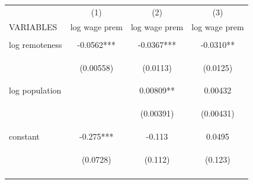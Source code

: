 \documentclass[12 pt]{article}
\begin{document}
\begin{table}
    \centering
    \begin{tabular}{lccc} \hline
     & (1) & (2) & (3) \\
    VARIABLES & log wage prem & log wage prem & log wage prem \\ \hline
    \vspace{4pt} & \begin{footnotesize}\end{footnotesize} & \begin{footnotesize}\end{footnotesize} & \begin{footnotesize}\end{footnotesize} \\
    log remoteness & -0.0562*** & -0.0367*** & -0.0310** \\
    \vspace{4pt} & \begin{footnotesize}(0.00558)\end{footnotesize} & \begin{footnotesize}(0.0113)\end{footnotesize} & \begin{footnotesize}(0.0125)\end{footnotesize} \\
    log population &  & 0.00809** & 0.00432 \\
    \vspace{4pt} & \begin{footnotesize}\end{footnotesize} & \begin{footnotesize}(0.00391)\end{footnotesize} & \begin{footnotesize}(0.00431)\end{footnotesize} \\
    constant & -0.275*** & -0.113 & 0.0495 \\
     & \begin{footnotesize}(0.0728)\end{footnotesize} & \begin{footnotesize}(0.112)\end{footnotesize} & \begin{footnotesize}(0.123)\end{footnotesize} \\
    \vspace{4pt} & \begin{footnotesize}\end{footnotesize} & \begin{footnotesize}\end{footnotesize} & \begin{footnotesize}\end{footnotesize} \\

\end{tabular}
\end{table}
\end{document}
